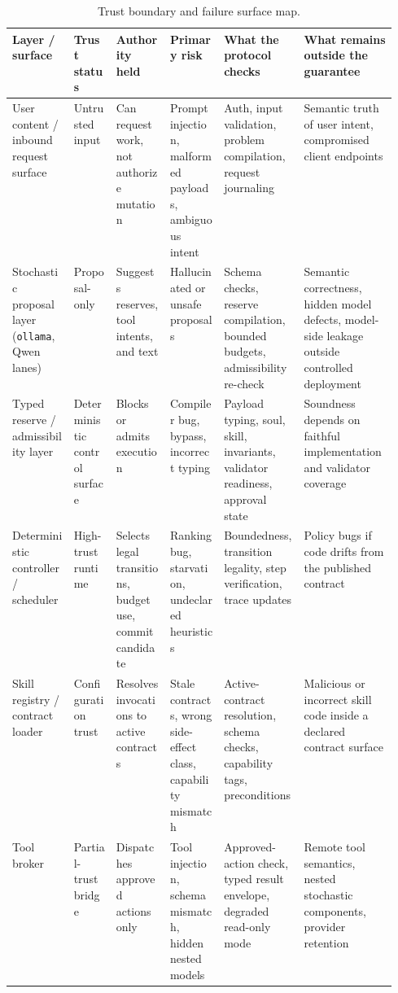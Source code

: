 \documentclass[11pt]{article}
\theoremstyle{remark}
\begin{document}
\begin{table}[H]
\centering
\caption{Trust boundary and failure surface map.}
\label{tab:trust-boundary}
\scriptsize
\begin{tabularx}{\linewidth}{@{}>{\raggedright\arraybackslash}p{0.16\linewidth}>{\raggedright\arraybackslash}p{0.11\linewidth}>{\raggedright\arraybackslash}p{0.14\linewidth}>{\raggedright\arraybackslash}p{0.14\linewidth}XX@{}}
\toprule
\textbf{Layer / surface} & \textbf{Trust status} & \textbf{Authority held} & \textbf{Primary risk} & \textbf{What the protocol checks} & \textbf{What remains outside the guarantee} \\
\midrule
User content / inbound request surface & Untrusted input & Can request work, not authorize mutation & Prompt injection, malformed payloads, ambiguous intent & Auth, input validation, problem compilation, request journaling & Semantic truth of user intent, compromised client endpoints \\
\addlinespace
Stochastic proposal layer (\texttt{ollama}, Qwen lanes) & Proposal-only & Suggests reserves, tool intents, and text & Hallucinated or unsafe proposals & Schema checks, reserve compilation, bounded budgets, admissibility re-check & Semantic correctness, hidden model defects, model-side leakage outside controlled deployment \\
\addlinespace
Typed reserve / admissibility layer & Deterministic control surface & Blocks or admits execution & Compiler bug, bypass, incorrect typing & Payload typing, soul, skill, invariants, validator readiness, approval state & Soundness depends on faithful implementation and validator coverage \\
\addlinespace
Deterministic controller / scheduler & High-trust runtime & Selects legal transitions, budget use, commit candidate & Ranking bug, starvation, undeclared heuristics & Boundedness, transition legality, step verification, trace updates & Policy bugs if code drifts from the published contract \\
\addlinespace
Skill registry / contract loader & Configuration trust & Resolves invocations to active contracts & Stale contracts, wrong side-effect class, capability mismatch & Active-contract resolution, schema checks, capability tags, preconditions & Malicious or incorrect skill code inside a declared contract surface \\
\addlinespace
Tool broker & Partial-trust bridge & Dispatches approved actions only & Tool injection, schema mismatch, hidden nested models & Approved-action check, typed result envelope, degraded read-only mode & Remote tool semantics, nested stochastic components, provider retention \\

\end{tabularx}
\end{table}
\end{document}
